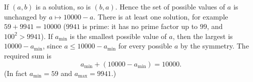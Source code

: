 If $(a,b)$ is a solution, so is $(b,a)$. Hence the set of possible values of $a$ is unchanged by $a\mapsto10000-a$. There is at least one solution, for example $59+9941=10000$ ($9941$ is prime: it has no prime factor up to $99$, and $100^2>9941$). If $a_{\min}$ is the smallest possible value of $a$, then the largest is $10000-a_{\min}$, since $a\le10000-a_{\min}$ for every possible $a$ by the symmetry. The required sum is
\[a_{\min}+\left(10000-a_{\min}\right)=\boxed{10000}.\]
(In fact $a_{\min}=59$ and $a_{\max}=9941$.)

